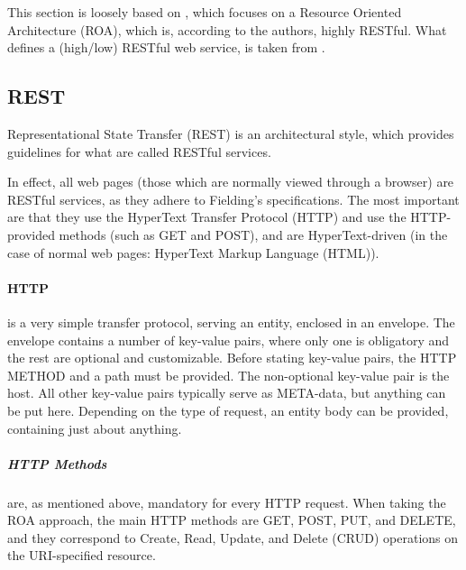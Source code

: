 This section is loosely based on \citet{restful_web_services}, which focuses on a Resource Oriented Architecture (ROA), which is, according to the authors, highly RESTful.
What defines a (high/low) RESTful web service, is taken from \citet{fielding_dissertation}.

\subsection{REST}
Representational State Transfer (REST) is an architectural style, which provides guidelines for what are called RESTful services.

In effect, all web pages (those which are normally viewed through a browser) are RESTful services, as they adhere to Fielding's specifications.
The most important are that they use the HyperText Transfer Protocol (HTTP) and use the HTTP-provided methods (such as GET and POST), and are HyperText-driven (in the case of normal web pages: HyperText Markup Language (HTML)).

\paragraph{HTTP} is a very simple transfer protocol, serving an entity, enclosed in an envelope.
The envelope contains a number of key-value pairs, where only one is obligatory and the rest are optional and customizable.
Before stating key-value pairs, the HTTP METHOD and a path must be provided.
The non-optional key-value pair is the host.
All other key-value pairs typically serve as META-data, but anything can be put here.
Depending on the type of request, an entity body can be provided, containing just about anything.

\subparagraph{HTTP Methods} are, as mentioned above, mandatory for every HTTP request.
When taking the ROA approach, the main HTTP methods are GET, POST, PUT, and DELETE, and they correspond to Create, Read, Update, and Delete (CRUD) operations on the URI-specified resource.

